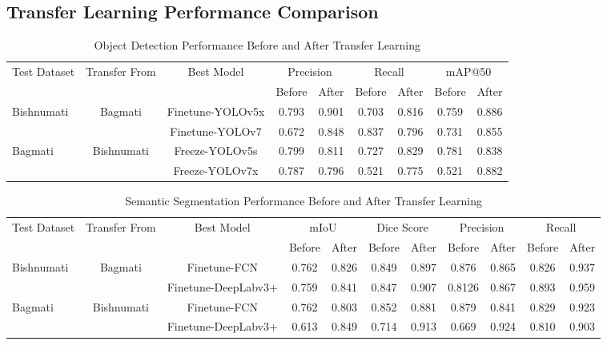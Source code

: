\documentclass{ieeeaccess}
\begin{document}
\subsection{Transfer Learning Performance Comparison}
\begin{table}[ht]
\centering
\caption{Object Detection Performance Before and After Transfer Learning}
\begin{tabular}{lcccccccc}
\hline
\multirow{2}{*}{Test Dataset} & \multirow{2}{*}{Transfer From} & \multirow{2}{*}{Best Model} & \multicolumn{2}{c}{Precision} & \multicolumn{2}{c}{Recall} & \multicolumn{2}{c}{mAP@50} \\    
& & & Before & After & Before & After & Before & After \\ \hline
\multirow{2}{*}{Bishnumati} & \multirow{2}{*}{Bagmati}
  & Finetune-YOLOv5x & 0.793 &  0.901 & 0.703 & 0.816 & 0.759 & 0.886 \\   
  &   & Finetune-YOLOv7 & 0.672 & 0.848 & 0.837 & 0.796 & 0.731 & 0.855 \\ 
\cline{2-9}
\multirow{2}{*}{Bagmati} & \multirow{2}{*}{Bishnumati}  
  & Freeze-YOLOv5s & 0.799  &  0.811 & 0.727  & 0.829 & 0.781  &  0.838\\   
  &   & Freeze-YOLOv7x & 0.787 & 0.796 & 0.521 & 0.775 & 0.521 & 0.882 \\ 
\hline
\end{tabular}
\label{table:TL-OD}
\end{table}

\begin{table}[ht]
\centering
\caption{Semantic Segmentation Performance Before and After Transfer Learning}
\begin{tabular}{lcccccccccc}
\hline
\multirow{2}{*}{Test Dataset} & \multirow{2}{*}{Transfer From} & \multirow{2}{*}{Best Model} & \multicolumn{2}{c}{mIoU} & \multicolumn{2}{c}{Dice Score} & \multicolumn{2}{c}{Precision} & \multicolumn{2}{c}{Recall} \\    
& & & Before & After & Before & After & Before & After & Before & After \\ \hline
\multirow{2}{*}{Bishnumati} & \multirow{2}{*}{Bagmati} 
  & Finetune-FCN  & 0.762 & 0.826 & 0.849 & 0.897 & 0.876 & 0.865 & 0.826 & 0.937 \\   
  &   & Finetune-DeepLabv3+ & 0.759 & 0.841 & 0.847 & 0.907 & 0.8126 & 0.867 & 0.893 & 0.959 \\ 
\cline{2-11}
\multirow{2}{*}{Bagmati} & \multirow{2}{*}{Bishnumati}  
  & Finetune-FCN & 0.762 & 0.803 & 0.852 & 0.881 & 0.879 & 0.841 & 0.829 & 0.923 \\   
  &   & Finetune-DeepLabv3+ & 0.613 & 0.849 & 0.714 & 0.913 & 0.669 & 0.924 & 0.810 & 0.903 \\ 
\hline
\end{tabular}
\label{table:TL-IS}
\end{table}
\end{document}
